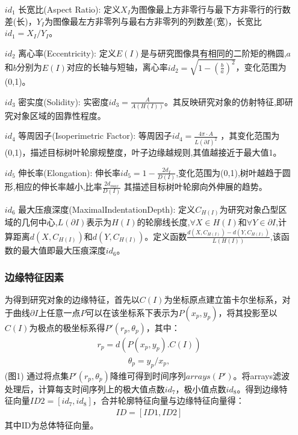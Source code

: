 \documentclass{whutmod}
\begin{document}
		\begin{itemize}	
		\item [$id_{1}$]长宽比(Aspect Ratio):
		定义$X_{I}$为图像最上方非零行与最下方非零行的行数差(长)，$Y_{I}$为图像最左方非零列与最右方非零列的列数差(宽)，长宽比$id_{1}=X_{I}/Y_{I}$。
		
		\item [$id_{2}$]离心率(Eccentricity): 
		定义$E(I)$是与研究图像具有相同的二阶矩的椭圆,$a$和$b$分别为$E(I)$对应的长轴与短轴，离心率$id_{2}=\sqrt{1-(\frac{b}{a})^{2}}$，变化范围为(0,1)。
		
		\item[$id_{3}$]密实度(Solidity):
		实密度$id_{3}=\frac{ A }{A(H(I))}$。其反映研究对象的仿射特征,即研究对象区域的固靠性程度。
		
		\item [$id_{4}$]等周因子(Isoperimetric Factor):
		等周因子$id_{4}=\frac{4\pi \cdot  A}{L(\partial I)^{2}}$ ，其变化范围为(0,1)，描述目标树叶轮廓规整度，叶子边缘越规则,其值越接近于最大值1。
		
		\item [$id_{5}$]伸长率(Elongation): 
		伸长率$id_{5}=1-\frac{2d_{I}}{D(I)}$,变化范围为(0,1),树叶越趋于圆形,相应的伸长率越小,比率$\frac{2d_{max}}{D(I)}$ 其描述目标树叶轮廓向外伸展的趋势。
		
		\item[$id_{6}$]最大压痕深度(MaximalIndentationDepth):
		定义$C_{H(I)}$为研究对象凸型区域的几何中心,$L(\partial I)$表示为$H(I)$的轮廓线长度,$\forall X\in H(I)$和$\forall Y\in \partial I$,计算距离$d(X,C_{H(I)})$和$d(Y,C_{H(I)})$。定义函数$\frac{ d(X,C_{H(I)})- d(Y,C_{H(I)})}{L(H(I))}$,该函数的最大值即最大压痕深度$id_{6}$。
		
		
		\subsubsection{边缘特征因素}
		为得到研究对象的边缘特征，首先以$C(I)$为坐标原点建立笛卡尔坐标系，对于曲线$\partial I$上任意一点$P$可以在该坐标系下表示为$P(x_{p},y_{p})$，将其投影至以$C(I)$为极点的极坐标系得${P}'(r_{p},\theta _{p})$，其中：
		\begin{gather}
		r_{p}=d(P(x_{p},y_{p}).C(I))
		\end{gather}
		\begin{gather}
		\theta _{p}=y_{p}/x_{p},
		\end{gather}
		(图1)
		通过将点集${{P}'(r_{p},\theta _{p})}$降维可得到时间序列$arrays({P}')$。将arrays滤波处理后，计算每支时间序列上的极大值点数$id_{7}$，极小值点数$id_{8}$。得到边缘特征向量$ID2=[id_{7},id_{8}]$，合并轮廓特征向量与边缘特征向量得：
		\begin{gather}
		ID=[ID1,ID2]
		\end{gather}
	     其中ID为总体特征向量。

\end{itemize}
\end{document}
